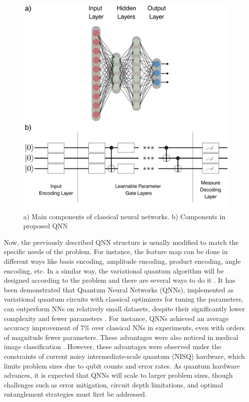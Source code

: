 \documentclass{article}
\begin{document}
\begin{figure}[h!]
    \centering
    \includegraphics[scale=0.15]{figures/nns.png}
    \caption{a) Main components of classical neural networks. b) Components in proposed QNN}
    \label{fig:qnn1}
\end{figure}


Now, the previously described QNN structure is usually modified to match the specific needs of the problem. 
For instance, the feature map can be done in different ways like basis encoding, amplitude encoding, product encoding, angle encoding, etc. 
In a similar way, the variational quantum algorithm will be designed according to the problem and there are several ways to do it \cite{9528698}.
It has been demonstrated that Quantum Neural Networks (QNNs), implemented as variational quantum circuits with classical optimizers
for tuning the parameters, can outperform NNs on relatively small datasets, despite their significantly 
lower complexity and fewer parameters \cite{10015720}. For instance, QNNs achieved an average accuracy improvement of 7\% over 
classical NNs in experiments, even with orders of magnitude fewer parameters.
These advantages were also noticed in medical image classification \cite{10613907, 9293291}. 
However, these advantages were observed under the constraints of current noisy intermediate-scale quantum (NISQ) hardware, which limits problem
sizes due to qubit counts and error rates. As quantum hardware advances, it is expected that QNNs will scale to larger problem sizes, though 
challenges such as error mitigation, circuit depth limitations, and optimal entanglement strategies must first be addressed.
\end{document}
